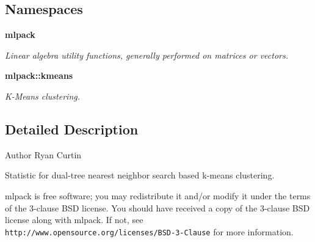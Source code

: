 \subsection*{Namespaces}
\begin{DoxyCompactItemize}
\item 
 \textbf{ mlpack}
\begin{DoxyCompactList}\small\item\em Linear algebra utility functions, generally performed on matrices or vectors. \end{DoxyCompactList}\item 
 \textbf{ mlpack\+::kmeans}
\begin{DoxyCompactList}\small\item\em K-\/\+Means clustering. \end{DoxyCompactList}\end{DoxyCompactItemize}


\subsection{Detailed Description}
\begin{DoxyAuthor}{Author}
Ryan Curtin
\end{DoxyAuthor}
Statistic for dual-\/tree nearest neighbor search based k-\/means clustering.

mlpack is free software; you may redistribute it and/or modify it under the terms of the 3-\/clause B\+SD license. You should have received a copy of the 3-\/clause B\+SD license along with mlpack. If not, see {\tt http\+://www.\+opensource.\+org/licenses/\+B\+S\+D-\/3-\/\+Clause} for more information. 